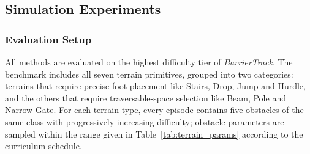 \documentclass[letterpaper, 10 pt, conference]{ieeeconf/ieeeconf}
\begin{document}
\subsection{Simulation Experiments}
\subsubsection{Evaluation Setup}
All methods are evaluated on the highest difficulty tier of \textit{BarrierTrack}. The benchmark includes all seven terrain primitives, grouped into two categories: terrains that require precise foot placement like Stairs, Drop, Jump and Hurdle, and the others that require traversable-space selection like Beam, Pole and Narrow Gate. For each terrain type, every episode contains five obstacles of the same class with progressively increasing difficulty; obstacle parameters are sampled within the range given in Table~\ref{tab:terrain_params} according to the curriculum schedule.
\end{document}
